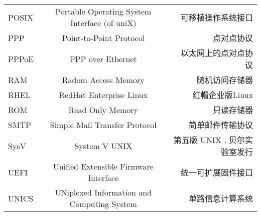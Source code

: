 \begin{landscape}
\begin{center}
\begin{supertabular}{l|c|r}
POSIX & Portable Operating System Interface (of uniX) & 可移植操作系统接口 \\
PPP & Point-to-Point Protocol & 点对点协议 \\
PPPoE & PPP over Ethernet& 以太网上的点对点协议 \\
RAM & Radom Access Memory & 随机访问存储器\\
RHEL & RedHat Enterprise Linux & 红帽企业版Linux\\
ROM & Read Only Memory & 只读存储器\\
SMTP & Simple Mail Transfer Protocol & 简单邮件传输协议 \\


SysV & System V UNIX & 第五版 UNIX , 贝尔实验室发行 \\
UEFI & Unified Extensible Firmware Interface & 统一可扩展固件接口 \\
UNICS & UNiplexed Information and Computing System & 单路信息计算系统\\
\end{supertabular}
\end{center}
\end{landscape}